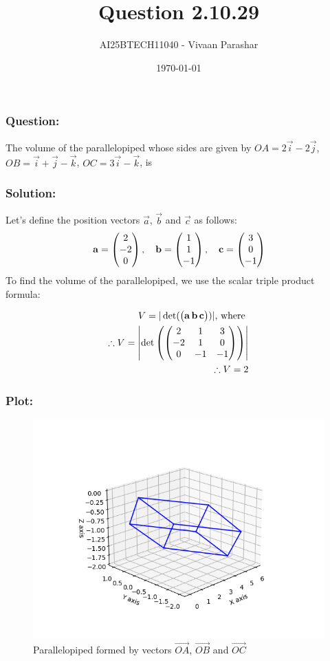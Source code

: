 \documentclass{beamer}
\title{Question 2.10.29}
\author{AI25BTECH11040 - Vivaan Parashar}
\date{\today}
\begin{document}
\frame{\titlepage}

\begin{frame}
    \frametitle{Question: }
    The volume of the parallelopiped whose sides are given by $\textit{OA} = 2\vec{i}-2\vec{j}$, $\textit{OB} = \vec{i}+\vec{j}-\vec{k}$, $\textit{OC} = 3\vec{i} - \vec{k}$, is
\end{frame}

\begin{frame}
    \frametitle{Solution: }
    Let's define the position vectors $\vec{a}$, $\vec{b}$ and $\vec{c}$ as follows:
    \begin{align}
        \mathbf{a} = \begin{pmatrix}2 \\ -2 \\ 0\end{pmatrix}, \quad
        \mathbf{b} = \begin{pmatrix}1 \\ 1 \\ -1\end{pmatrix}, \quad
        \mathbf{c} = \begin{pmatrix}3 \\ 0 \\ -1\end{pmatrix}\\
    \end{align}
    To find the volume of the parallelopiped, we use the scalar triple product formula:

    \begin{align}
        V = |\det(\begin{pmatrix}\mathbf{a}\, \mathbf{b}\, \mathbf{c}\end{pmatrix})|\text{, where } \\
        \therefore V = \left|\det\left(\begin{pmatrix}2 & 1 & 3                \\ -2 & 1 & 0 \\ 0 & -1 & -1\end{pmatrix}\right)\right|\\
        \therefore V = 2
    \end{align}
\end{frame}

\begin{frame}
    \frametitle{Plot: }
    \begin{figure}[h!]
        \centering
        \includegraphics[width=0.8\columnwidth]{../figs/plot.png}
        \caption{Parallelopiped formed by vectors $\vec{OA}$, $\vec{OB}$ and $\vec{OC}$}
        \label{fig:2.10.29}
    \end{figure}
\end{frame}
\end{document}
